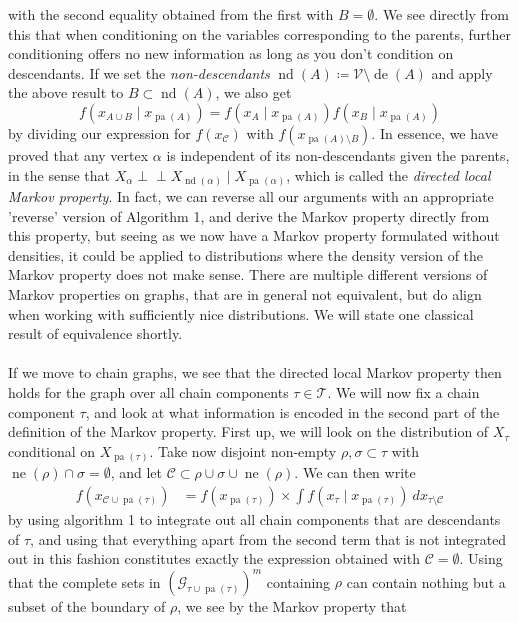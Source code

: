 \documentclass[11pt, a4paper]{memoir}
\theoremstyle{break}
\theoremstyle{break}
\theoremstyle{nonumberplain}
\newcommand{\indep}{\perp \!\!\! \perp}
\DeclareMathOperator{\pa}{pa}
\DeclareMathOperator{\de}{de}
\DeclareMathOperator{\nei}{ne}
\DeclareMathOperator{\nd}{nd}
\begin{document}
with the second equality obtained from the first with $B=\emptyset$. We see directly from this that when conditioning on the variables corresponding to the parents, further conditioning offers no new information as long as you don't condition on descendants. If we set the \textit{non-descendants} $\nd(A)\coloneqq\mathcal{V}\setminus \de(A)$ and apply the above result to $B\subset \nd(A)$, we also get
$$f\left(x_{A\cup B}\mid x_{\pa(A)}\right)=f\left(x_A\mid x_{\pa(A)}\right)f\left(x_{B}\mid x_{\pa(A)}\right)$$
by dividing our expression for $f(x_\mathcal{C})$ with $f(x_{\pa(A)\setminus B})$. In essence, we have proved that any vertex $\alpha$ is independent of its non-descendants given the parents, in the sense that $X_\alpha\indep X_{\nd(\alpha)}\mid X_{\pa(\alpha)}$, which is called the \textit{directed local Markov property}. In fact, we can reverse all our arguments with an appropriate 'reverse' version of Algorithm 1, and derive the Markov property directly from this property, but seeing as we now have a Markov property formulated without densities, it could be applied to distributions where the density version of the Markov property does not make sense. There are multiple different versions of Markov properties on graphs, that are in general not equivalent, but do align when working with sufficiently nice distributions. We will state one classical result of equivalence shortly.\\\\
If we move to chain graphs, we see that the directed local Markov property then holds for the graph over all chain components $\tau\in \mathscr{T}$. We will now fix a chain component $\tau$, and look at what information is encoded in the second part of the definition of the Markov property. First up, we will look on the distribution of $X_\tau$ conditional on $X_{\pa(\tau)}$. Take now disjoint non-empty $\rho,\sigma\subset \tau$ with $\nei(\rho)\cap \sigma=\emptyset$, and let $\mathcal{C}\subset \rho\cup\sigma\cup \nei(\rho)$. We can then write
\begin{align*}
f\left(x_{\mathcal{C}\cup\pa(\tau)}\right)&=f(x_{\pa(\tau)})\times \int f\left(x_\tau\mid x_{\pa(\tau)}\right)\ dx_{\tau\setminus \mathcal{C}}
\end{align*}
by using algorithm 1 to integrate out all chain components that are descendants of $\tau$, and using that everything apart from the second term that is not integrated out in this fashion constitutes exactly the expression obtained with $\mathcal{C}=\emptyset$. Using that the complete sets in $(\mathcal{G}_{\tau\cup\pa(\tau)})^{m}$ containing $\rho$ can contain nothing but a subset of  the boundary of $\rho$, we see by the Markov property that 
\end{document}
